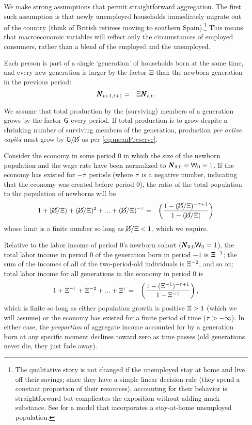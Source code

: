 \documentclass{handout}
\begin{document}
We make strong assumptions that permit straightforward aggregation. The first such assumption is that newly unemployed households immediately migrate out of the
country (think of British retirees moving to southern
Spain).\footnote{The qualitative story is not changed if the unemployed stay at home and live off their savings; since they have a simple linear
  decision rule (they spend a constant proportion of their resources),
  accounting for their behavior is straightforward but
  complicates the exposition without adding much substance.  See \cite{cjSOE} for a model that incorporates a stay-at-home unemployed population.}
This means that macroeconomic variables will reflect only the circumstances of 
employed consumers, rather than a blend of the employed and the unemployed.

Each person is part of a single `generation' of households born at the
same time, and every new generation is larger by the factor $\Xi$
than the newborn generation in the previous period:
\begin{eqnarray}
  \pmb{N}_{t+1,t+1} & = & \Xi \pmb{N}_{t,t}
.
\end{eqnarray}

We assume that total production by the (surviving) members of a generation grows by
the factor $\mathsf{G}$ every period.  If total production is to grow
despite a shrinking number of surviving members of the generation, 
production {\it per active capita} must grow by $\mathsf{G}/\cancel{\mho}$ as per \eqref{eq:meanPreserve}.

Consider the economy in some period 0 in which the size of the newborn population
and the wage rate have been normalized to $\pmb{N}_{0,0} = \mathsf{W}_{0} = 1$.  If the economy
has existed for $-\tau$ periods (where $\tau$ is a negative number, indicating that the economy was created before period 0), the ratio of the total population to the population
of newborns will be 
\begin{eqnarray}
  1 + (\cancel{\mho}/\Xi)+ (\cancel{\mho}/\Xi)^{2}+ ... +(\cancel{\mho}/\Xi)^{-\tau} & = & \left(\frac{1-(\cancel{\mho}/\Xi)^{-\tau+1}}{1-(\cancel{\mho}/\Xi)}\right)
\end{eqnarray}
whose limit is a finite number so long as $\cancel{\mho}/\Xi < 1$, which we require.

Relative to the labor income of period 0's newborn cohort ($\pmb{N}_{0,0} \mathsf{W}_{0} = 1$),
the total labor income in period 0 of the generation born in period $-1$ is $\Xi^{-1}$; the sum of the incomes of all of the two-period-old individuals is $\Xi^{-2}$, and so on; total labor income for all generations in the economy in period 0 is
\begin{eqnarray}
  1 + \Xi^{-1}+ \Xi^{-2}+ ...+\Xi^{\tau} & = & \left(\frac{1-(\Xi^{-1})^{-\tau+1}}{1-\Xi^{-1}}\right) \label{eq:LabIncTot}
,
\end{eqnarray}
which is finite so long as either population growth is positive $\Xi>1$ (which 
we will assume) or 
the economy has existed for a finite period of time ($\tau > -\infty$).  
In either case, the {\it proportion} of aggregate income accounted for by a generation
born at any specific moment declines toward zero as time passes (old generations never die,
they just fade away).
\end{document}
